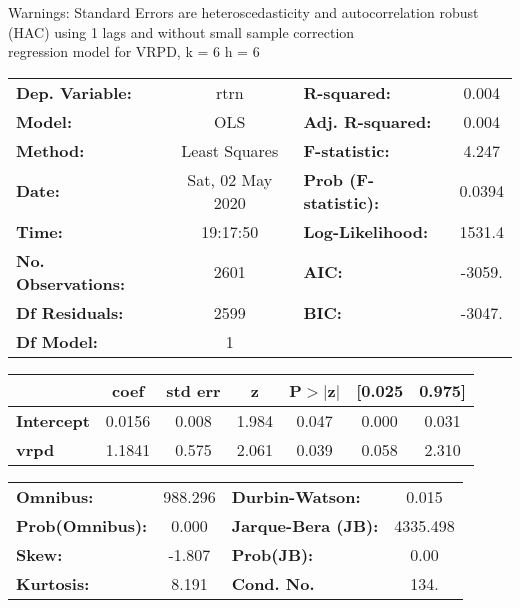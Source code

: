 Warnings: \newline
 [1] Standard Errors are heteroscedasticity and autocorrelation robust (HAC) using 1 lags and without small sample correction\\ 

regression model for VRPD, k = 6 h = 6\begin{center}
\begin{tabular}{lclc}
\toprule
\textbf{Dep. Variable:}    &       rtrn       & \textbf{  R-squared:         } &     0.004   \\
\textbf{Model:}            &       OLS        & \textbf{  Adj. R-squared:    } &     0.004   \\
\textbf{Method:}           &  Least Squares   & \textbf{  F-statistic:       } &     4.247   \\
\textbf{Date:}             & Sat, 02 May 2020 & \textbf{  Prob (F-statistic):} &   0.0394    \\
\textbf{Time:}             &     19:17:50     & \textbf{  Log-Likelihood:    } &    1531.4   \\
\textbf{No. Observations:} &        2601      & \textbf{  AIC:               } &    -3059.   \\
\textbf{Df Residuals:}     &        2599      & \textbf{  BIC:               } &    -3047.   \\
\textbf{Df Model:}         &           1      & \textbf{                     } &             \\
\bottomrule
\end{tabular}
\begin{tabular}{lcccccc}
                   & \textbf{coef} & \textbf{std err} & \textbf{z} & \textbf{P$> |$z$|$} & \textbf{[0.025} & \textbf{0.975]}  \\
\midrule
\textbf{Intercept} &       0.0156  &        0.008     &     1.984  &         0.047        &        0.000    &        0.031     \\
\textbf{vrpd}      &       1.1841  &        0.575     &     2.061  &         0.039        &        0.058    &        2.310     \\
\bottomrule
\end{tabular}
\begin{tabular}{lclc}
\textbf{Omnibus:}       & 988.296 & \textbf{  Durbin-Watson:     } &    0.015  \\
\textbf{Prob(Omnibus):} &   0.000 & \textbf{  Jarque-Bera (JB):  } & 4335.498  \\
\textbf{Skew:}          &  -1.807 & \textbf{  Prob(JB):          } &     0.00  \\
\textbf{Kurtosis:}      &   8.191 & \textbf{  Cond. No.          } &     134.  \\
\bottomrule
\end{tabular}
\end{center}


